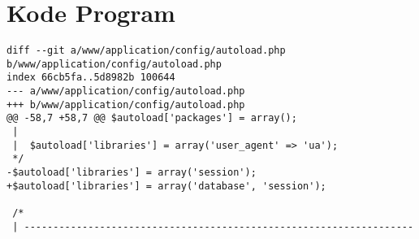 \chapter{Kode Program}
\label{lamp:A}

%
%
%


\begin{lstlisting}[caption=autoload.php]
diff --git a/www/application/config/autoload.php b/www/application/config/autoload.php
index 66cb5fa..5d8982b 100644
--- a/www/application/config/autoload.php
+++ b/www/application/config/autoload.php
@@ -58,7 +58,7 @@ $autoload['packages'] = array();
 |
 |	$autoload['libraries'] = array('user_agent' => 'ua');
 */
-$autoload['libraries'] = array('session');
+$autoload['libraries'] = array('database', 'session');
 
 /*
 | -------------------------------------------------------------------
\end{lstlisting}

